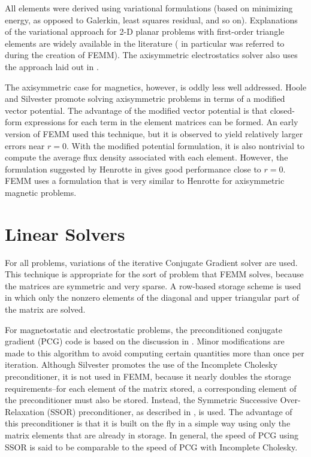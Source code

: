 \documentclass[12pt]{report}
\begin{document}
All elements were derived using variational formulations (based on
minimizing energy, as opposed to Galerkin, least squares residual,
and so on).  Explanations of the variational approach for 2-D
planar problems with first-order triangle elements are widely
available in the literature (\cite{allaire} in particular was
referred to during the creation of FEMM).  The axisymmetric
electrostatics solver also uses the approach laid out in
\cite{allaire}.

The axisymmetric case for magnetics, however, is oddly less well
addressed. Hoole \cite{Hoole} and Silvester \cite{silv} promote
solving axisymmetric problems in terms of a modified vector
potential. The advantage of the modified vector potential is that
closed-form expressions for each term in the element matrices can
be formed. An early version of FEMM used this technique, but it is
observed to yield relatively larger errors near $r=0$. With the
modified potential formulation, it is also nontrivial to compute
the average flux density associated with each element. However, the
formulation suggested by Henrotte in \cite{Henrotte} gives good
performance close to $r=0$. FEMM uses a formulation that is very
similar to Henrotte for axisymmetric magnetic problems.

\section{Linear Solvers}

For all problems, variations of the iterative Conjugate Gradient
solver are used.  This technique is appropriate for the sort of
problem that FEMM solves, because the matrices are symmetric and
very sparse.  A row-based storage scheme is used in which only the
nonzero elements of the diagonal and upper triangular part of the
matrix are solved.

For magnetostatic and electrostatic problems, the preconditioned
conjugate gradient (PCG) code is based on the discussion in
\cite{silv}. Minor modifications are made to this algorithm to
avoid computing certain quantities more than once per iteration.
Although Silvester promotes the use of the Incomplete Cholesky
preconditioner, it is not used in FEMM, because it nearly doubles
the storage requirements--for each element of the matrix stored, a
corresponding element of the preconditioner must also be stored.
Instead, the Symmetric Successive Over-Relaxation (SSOR)
preconditioner, as described in \cite{fletcher}, is used. The
advantage of this preconditioner is that it is built on the fly in
a simple way using only the matrix elements that are already in
storage. In general, the speed of PCG using SSOR is said to be
comparable to the speed of PCG with Incomplete Cholesky.
\end{document}
